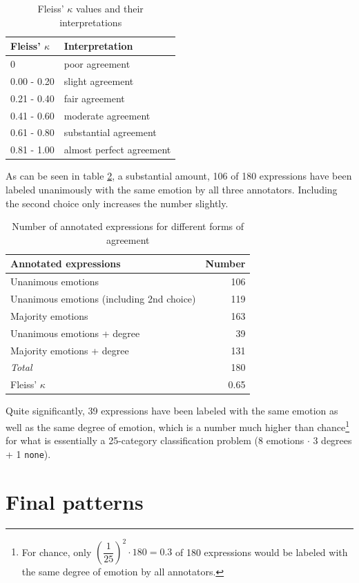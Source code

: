 \begin{table}[h]
\centering
\begin{tabular}{l|l}
Fleiss' $\kappa$ & Interpretation\\\hline
0              & poor agreement           \\
0.00 - 0.20    & slight agreement         \\
0.21 - 0.40    & fair agreement           \\
0.41 - 0.60    & moderate agreement       \\
0.61 - 0.80    & substantial agreement    \\
0.81 - 1.00    & almost perfect agreement
\end{tabular}
\caption{Fleiss' $\kappa$ values and their interpretations \cite{kappa}}
\label{tab:kappa_interpretation}
\end{table}

As can be seen in table \ref{tab:annotation}, a substantial amount, 106 of 180 expressions have been labeled unanimously with the same emotion by all three annotators. Including the second choice only increases the number slightly. 

\begin{table}
\centering
\begin{tabular}{l|r}
Annotated expressions & Number\\\hline
Unanimous emotions & 106\\
Unanimous emotions (including 2nd choice) & 119\\
Majority emotions & 163\\
Unanimous emotions + degree & 39\\
Majority emotions + degree & 131\\\hline
\textit{Total} & 180\\\hline
Fleiss' $\kappa$ & 0.65
\end{tabular}
\caption{Number of annotated expressions for different forms of agreement}
\label{tab:annotation}
\end{table}

Quite significantly, 39 expressions have been labeled with the same emotion as well as the same degree of emotion, which is a number much higher than chance\footnote{For chance, only $(\dfrac{1}{25})^{2} \cdot 180 = 0.3$ of 180 expressions would be labeled with the same degree of emotion by all annotators.} for what is essentially a 25-category classification problem (8 emotions $\cdot$ 3 degrees + 1 \texttt{none}).

\section{Final patterns} \label{sec:final_patterns}

